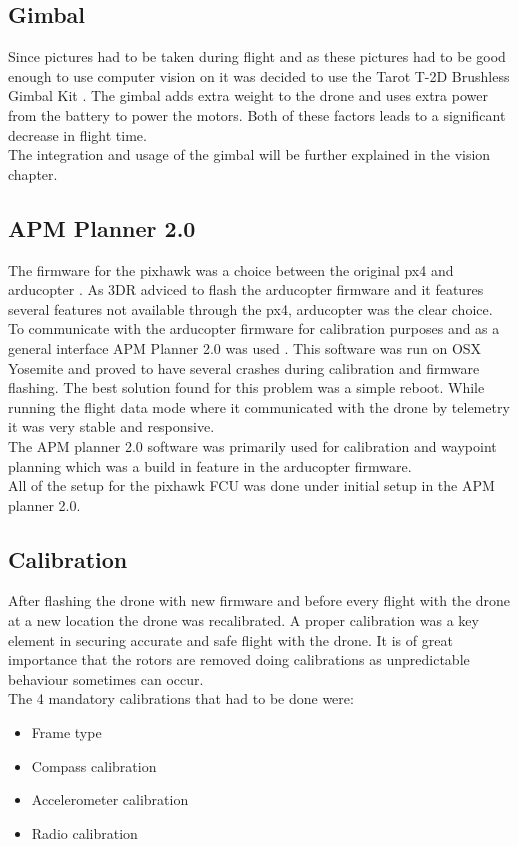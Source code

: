 \subsection*{Gimbal}
Since pictures had to be taken during flight and as these pictures had to be good enough to use computer vision on it was decided to use the Tarot T-2D Brushless Gimbal Kit \cite{Ref:Gimbal}. The gimbal adds extra weight to the drone and uses extra power from the battery to power the motors. Both of these factors leads to a significant decrease in flight time.\\
The integration and usage of the gimbal will be further explained in the vision chapter. 
\subsection*{APM Planner 2.0}
The firmware for the pixhawk was a choice between the original px4 and arducopter \cite{Ref:Arducopter}. As 3DR adviced to flash the arducopter firmware and it features several features not available through the px4, arducopter was the clear choice.\\
To communicate with the arducopter firmware for calibration purposes and as a general interface APM Planner 2.0 was used \cite{APM2}. This software was run on OSX Yosemite and proved to have several crashes during calibration and firmware flashing. The best solution found for this problem was a simple reboot. While running the flight data mode where it communicated with the drone by telemetry it was very stable and responsive.\\
The APM planner 2.0 software was primarily used for calibration and waypoint planning which was a build in feature in the arducopter firmware.\\
All of the setup for the pixhawk FCU was done under initial setup in the APM planner 2.0.

\subsection*{Calibration}

After flashing the drone with new firmware and before every flight with the drone at a new location the drone was recalibrated. A proper calibration was a key element in securing accurate and safe flight with the drone. It is of great importance that the rotors are removed doing calibrations as unpredictable behaviour sometimes can occur.\\
The 4 mandatory calibrations that had to be done were:
\begin{itemize}
\item Frame type
\item Compass calibration
\item Accelerometer calibration
\item Radio calibration
\end{itemize}

